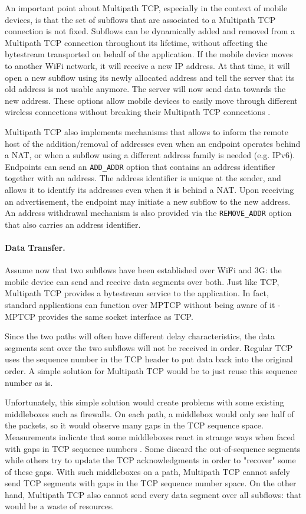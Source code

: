 An important point about Multipath TCP, especially in the context of 
mobile devices, is that the set of subflows that are associated to a Multipath TCP 
connection is not fixed. Subflows can be dynamically added and removed from a 
Multipath TCP connection throughout its lifetime, without affecting the 
bytestream transported on behalf of the application. 
If the mobile device moves to another WiFi network, it will receive a new IP 
address. At that time, it will open a new subflow using its newly allocated address 
and tell the server that its old address is not usable anymore. The server will now 
send data towards the new address. These options allow mobile devices to easily move
through different wireless connections without breaking their
Multipath TCP connections \cite{Paasch_Mobile:2012}.

Multipath TCP also implements mechanisms that allows to inform the
remote host of the addition/removal of addresses even when an endpoint operates behind a NAT, or when a subflow using a
different address family is needed (e.g. IPv6). Endpoints can send
an \texttt{ADD\_ADDR} option that contains an address identifier together with an address.
The address identifier is unique at the sender, and allows it to identify its addresses
even when it is behind a NAT. Upon receiving an advertisement, the endpoint may initiate a new subflow to
the new address. An address withdrawal mechanism is also provided via the \texttt{REMOVE\_ADDR}
option that also carries an address identifier. 

\paragraph{Data Transfer.} Assume now that two subflows have been established over WiFi and 3G:
the mobile device can send and receive data segments over both. Just like TCP, Multipath
TCP provides a bytestream service to the application.  In
fact, standard applications can function over MPTCP without being
aware of it - MPTCP provides the same socket interface as TCP.

Since the two paths will often have different delay characteristics,
the data segments sent over the two subflows will not be received in
order. Regular TCP uses the sequence number in the TCP header
to put data back into the original order. A simple solution for
Multipath TCP would be to just reuse this sequence number as
is. 

Unfortunately, this simple solution would create problems with
some existing middleboxes such as firewalls. On each path, a middlebox
would only see half of the packets, so it would observe many gaps in
the TCP sequence space. Measurements indicate that some middleboxes
react in strange ways when faced with gaps in TCP sequence
numbers \cite{honda2011still}. Some discard the out-of-sequence segments while others try to
update the TCP acknowledgments in order to "recover" some of these
gaps. With such middleboxes on a path, Multipath TCP cannot safely
send TCP segments with gaps in the TCP sequence number space. On the
other hand, Multipath TCP also cannot send every data segment over all
subflows: that would be a waste of resources.

